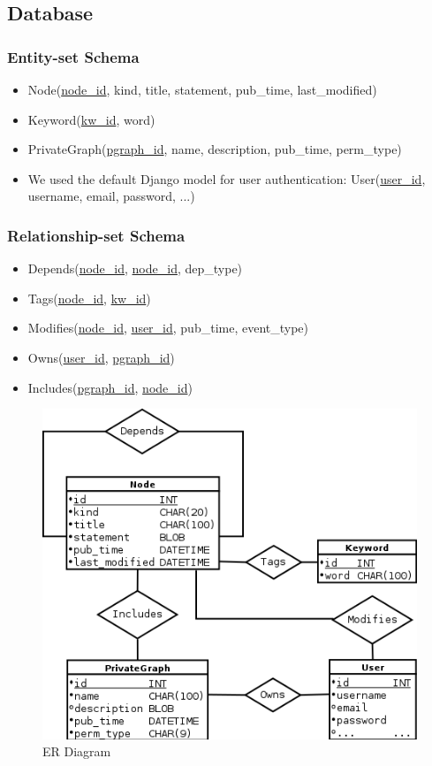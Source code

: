 \documentclass{acm_proc_article-sp}
\begin{document}
\subsection{Database}
\subsubsection{Entity-set Schema}
\begin{itemize}
\item Node(\underline{node\_id}, kind, title, statement, pub\_time, last\_modified)
\item Keyword(\underline{kw\_id}, word)
\item PrivateGraph(\underline{pgraph\_id}, name, description, pub\_time, perm\_type)
\item We used the default Django model for user authentication:
User(\underline{user\_id}, username, email, password, ...)\\ 
\end{itemize}

\subsubsection{Relationship-set Schema}
\begin{itemize}
\item Depends(\underline{node\_id}, \underline{node\_id}, dep\_type)
\item Tags(\underline{node\_id}, \underline{kw\_id})
\item Modifies(\underline{node\_id}, \underline{user\_id}, pub\_time, event\_type)
\item Owns(\underline{user\_id}, \underline{pgraph\_id})
\item Includes(\underline{pgraph\_id}, \underline{node\_id})
\end{itemize}

\begin{figure}
\centering
\includegraphics[scale=0.5]{socialmath_ER.png}
\caption{ER Diagram}
\end{figure}
\end{document}
